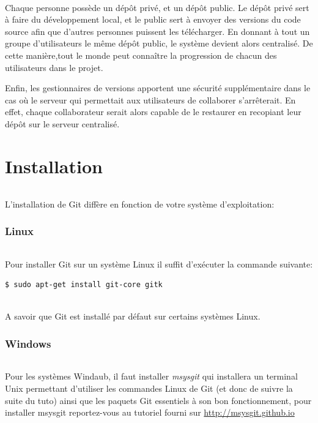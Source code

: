 \documentclass[french, a4paper, 12pt, titlepage]{article}
\begin{document}
\paragraph{} Chaque personne possède un dépôt privé, et un dépôt public.  Le dépôt privé sert à faire du développement local, et le public sert à envoyer des versions du code source afin que d'autres personnes puissent les télécharger. En donnant à tout un groupe d'utilisateurs le même dépôt public, le système devient alors centralisé. De cette manière,tout le monde peut connaître la progression de chacun des utilisateurs dans le projet.

Enfin, les gestionnaires de versions apportent une sécurité supplémentaire dans le cas où le serveur qui permettait aux utilisateurs de collaborer s'arrêterait. En effet, chaque collaborateur serait alors capable de le restaurer en recopiant leur dépôt sur le serveur centralisé.

\newpage
\part{Installation}
\paragraph{}L'installation de Git diffère en fonction de votre système d'exploitation:
\section{Linux}
\paragraph{} Pour installer Git sur un système Linux il suffit d'exécuter la commande suivante:
\begin{lstlisting}
$ sudo apt-get install git-core gitk
\end{lstlisting}
\paragraph{}A savoir que Git est installé par défaut sur certains systèmes Linux.

\section{Windows}
\paragraph{}Pour les systèmes Windaub, il faut installer \emph{msysgit} qui installera un terminal Unix permettant d'utiliser les commandes Linux de Git (et donc de suivre la suite du tuto) ainsi que les paquets Git essentiels à son bon fonctionnement, pour installer msysgit reportez-vous au tutoriel fourni sur \url{http://msysgit.github.io}
\end{document}
